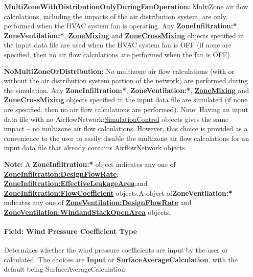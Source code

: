 \textbf{MultiZoneWithDistributionOnlyDuringFanOperation:} MultiZone air flow calculations, including the impacts of the air distribution system, are only performed when the HVAC system fan is operating. Any \textbf{ZoneInfiltration:*}, \textbf{ZoneVentilation:*}, \textbf{\hyperref[zonemixing]{ZoneMixing}} and \textbf{\hyperref[zonecrossmixing]{ZoneCrossMixing}} objects specified in the input data file are used when the HVAC system fan is OFF (if none are specified, then no air flow calculations are performed when the fan is OFF).

\textbf{NoMultiZoneOrDistribution:} No multizone air flow calculations (with or without the air distribution system portion of the network) are performed during the simulation. Any \textbf{ZoneInfiltration:*}, \textbf{ZoneVentilation:*}, \textbf{\hyperref[zonemixing]{ZoneMixing}} and \textbf{\hyperref[zonecrossmixing]{ZoneCrossMixing}} objects specified in the input data file are simulated (if none are specified, then no air flow calculations are performed). Note: Having an input data file with no AirflowNetwork:\hyperref[simulationcontrol]{SimulationControl} objects gives the same impact -- no multizone air flow calculations. However, this choice is provided as a convenience to the user to easily disable the multizone air flow calculations for an input data file that already contains AirflowNetwork objects.

\textbf{Note:} A \textbf{ZoneInfiltration:*} object indicates any one of \textbf{\hyperref[zoneinfiltrationdesignflowrate]{ZoneInfiltration:DesignFlowRate}}, \textbf{\hyperref[zoneinfiltrationeffectiveleakagearea]{ZoneInfiltration:EffectiveLeakageArea}},and \textbf{\hyperref[zoneinfiltrationflowcoefficient]{ZoneInfiltration:FlowCoefficient}} objects.A object of\textbf{ZoneVentilation:*} indicates any one of \textbf{\hyperref[zoneventilationdesignflowrate]{ZoneVentilation:DesignFlowRate}} and \textbf{\hyperref[zoneventilationwindandstackopenarea]{ZoneVentilation:WindandStackOpenArea}} objects\textbf{.}

\paragraph{Field: Wind Pressure Coefficient Type}\label{field-wind-pressure-coefficient-type}

Determines whether the wind pressure coefficients are input by the user or calculated. The choices are \textbf{Input} or \textbf{SurfaceAverageCalculation}, with the default being SurfaceAverageCalculation.

